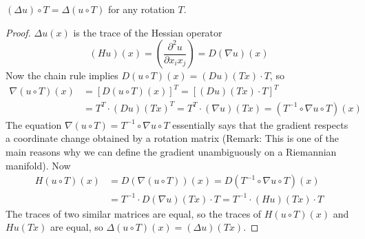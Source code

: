 \begin{theorem}
    $(\Delta u) \circ T = \Delta (u \circ T)$ for any rotation $T$.
\end{theorem}
\begin{proof}
    $\Delta u(x)$ is the trace of the Hessian operator
    \[ (Hu)(x) = \left( \frac{\partial^2 u}{\partial x_ix_j} \right) = D(\nabla u)(x) \]
    Now the chain rule implies $D(u \circ T)(x) = (Du)(Tx) \cdot T$, so
    \begin{align*}
        \nabla (u \circ T)(x) &= [D(u \circ T)(x)]^T = [(Du)(Tx) \cdot T]^T\\
        &= T^T \cdot (Du)(Tx)^T = T^T \cdot (\nabla u)(Tx) = (T^{-1} \circ \nabla u \circ T)(x)
    \end{align*}
    The equation $\nabla (u \circ T) = T^{-1} \circ \nabla u \circ T$ essentially says that the gradient respects a coordinate change obtained by a rotation matrix (Remark: This is one of the main reasons why we can define the gradient unambiguously on a Riemannian manifold). Now
    \begin{align*}
        H(u \circ T)(x) &= D(\nabla (u \circ T))(x) = D(T^{-1} \circ \nabla u \circ T)(x)\\
        &= T^{-1} \cdot D(\nabla u)(Tx) \cdot T = T^{-1} \cdot (Hu)(Tx) \cdot T
    \end{align*}
    The traces of two similar matrices are equal, so the traces of $H(u \circ T)(x)$ and $Hu(Tx)$ are equal, so $\Delta (u \circ T)(x) = (\Delta u)(Tx)$.
\end{proof}

